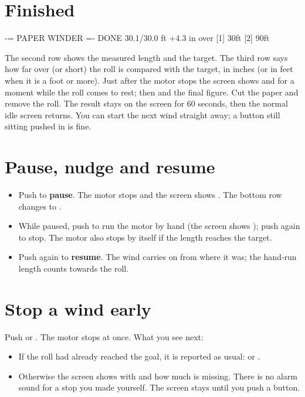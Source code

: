 \section{Finished}
\begin{lcd}
 -= PAPER WINDER =-
DONE 30.1/30.0 ft
+4.3 in over
[1] 30ft    [2] 90ft
\end{lcd}

The second row shows the measured length and the target. The third row says
how far over (or short) the roll is compared with the target, in inches (or in
feet when it is a foot or more). Just after the motor stops the screen shows
 and  for a moment while the roll comes to rest;
then  and the final figure. Cut the paper and remove the roll. The result stays on the screen
for 60 seconds, then the normal idle screen returns. You can start the next
wind straight away; a button still sitting pushed in is fine.

\section{Pause, nudge and resume}\label{sec:pause}
\begin{itemize}
  \item Push  to \textbf{pause}. The motor stops and the screen shows
        . The bottom row changes to .
  \item While paused, push  to run the motor by hand (the screen shows
        ); push  again to stop. The motor
        also stops by itself if the length reaches the target.
  \item Push  again to \textbf{resume}. The wind carries on from where
        it was; the hand-run length counts towards the roll.
\end{itemize}

\section{Stop a wind early}\label{sec:stop}
Push  or . The motor stops at once. What you see next:
\begin{itemize}
  \item If the roll had already reached the goal, it is reported as usual:
         or .
  \item Otherwise the screen shows  with
         and how much is missing. There is no alarm sound for a
        stop you made yourself. The screen stays until you push a button.
\end{itemize}

